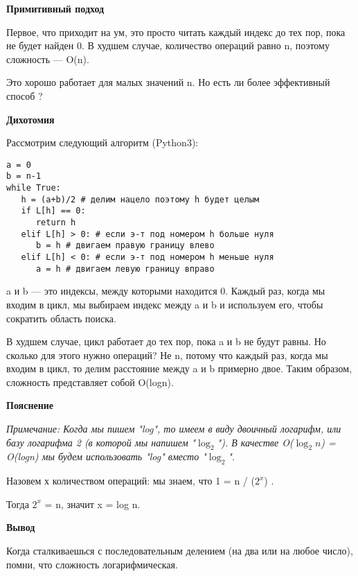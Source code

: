 \vspace{\baselineskip}
\textbf{Примитивный подход}

\vspace{\baselineskip}
Первое, что приходит на ум, это просто читать каждый индекс до тех пор, пока не будет найден 0. В худшем случае, количество операций равно n, поэтому сложность --- O(n). 

\vspace{\baselineskip}
Это хорошо работает для малых значений n. Но есть ли более эффективный способ ?

\vspace{\baselineskip}
\textbf{Дихотомия}

\vspace{\baselineskip}
Рассмотрим следующий алгоритм (Python3):

\vspace{\baselineskip}
\begin{tcolorbox}
\begin{verbatim}
a = 0
b = n-1
while True:
   h = (a+b)/2 # делим нацело поэтому h будет целым
   if L[h] == 0:
      return h
   elif L[h] > 0: # если э-т под номером h больше нуля
      b = h # двигаем правую границу влево
   elif L[h] < 0: # если э-т под номером h меньше нуля
      a = h # двигаем левую границу вправо
\end{verbatim}
\end{tcolorbox}


a и b --- это индексы, между которыми находится 0. Каждый раз, когда мы входим в цикл, мы выбираем индекс между a и b и используем его, чтобы сократить область поиска. 

\vspace{\baselineskip}
В худшем случае, цикл работает до тех пор, пока a и b не будут равны. Но сколько для этого нужно операций? Не n, потому что каждый раз, когда мы входим в цикл, то делим расстояние между a и b примерно двое. Таким образом, сложность представляет собой O(logn).

\vspace{\baselineskip}
\textbf{Пояснение}

\vspace{\baselineskip}
\textit{Примечание: Когда мы пишем "log", то имеем в виду двоичный логарифм, или базу логарифма 2 (в которой мы напишем "$\log_{2}$"). В качестве O($\log_{2}{n}$) = O(logn)  мы будем использовать "log" вместо "$\log_{2}$".}

\vspace{\baselineskip}
Назовем х количеством операций: мы знаем, что 1 = n / ($2^{x}$) . 

\vspace{\baselineskip}
Тогда $2^{x}$ = n,  значит x = log n.

\vspace{\baselineskip}
\textbf{Вывод}

\vspace{\baselineskip}
Когда сталкиваешься с последовательным делением (на два или на любое число), помни, что сложность логарифмическая.

